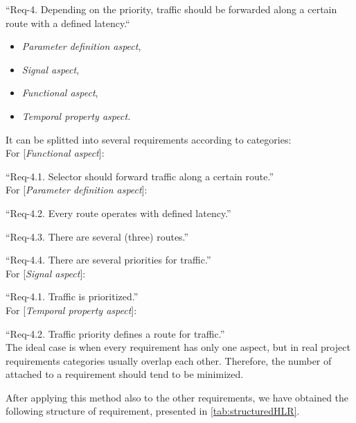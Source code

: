 \small ``Req-4. Depending on the priority, traffic should be forwarded along a certain route with a defined latency.``

\normalsize
\begin{itemize}
	\item \textit{Parameter definition aspect}, 
	\item \textit{Signal aspect},
	\item \textit{Functional aspect}, 
	\item \textit{Temporal property aspect.}
\end{itemize}

It can be splitted into several requirements according to \asp categories:\\

For [\textit{Functional aspect}]:

\small
``Req-4.1.	 Selector should forward traffic along a certain route.''\\

\normalsize For [\textit{Parameter definition aspect}]:

\small
``Req-4.2.	 Every route operates with defined latency.''

``Req-4.3.	There are several (three) routes.''

``Req-4.4.	There are several priorities for traffic.''\\

\normalsize For [\textit{Signal aspect}]:

 \small ``Req-4.1.	Traffic is prioritized.''\\

\normalsize For [\textit{Temporal property aspect}]:

\small ``Req-4.2.	Traffic priority defines a route for traffic.''\\

\normalsize The ideal case is when every requirement has only one aspect, but in real project requirements categories usually overlap each other. Therefore, the number of \asp attached to a requirement should tend to be minimized.

After applying this method also to the other requirements, we have obtained the following structure of requirement, presented in \autoref{tab:structuredHLR}.

